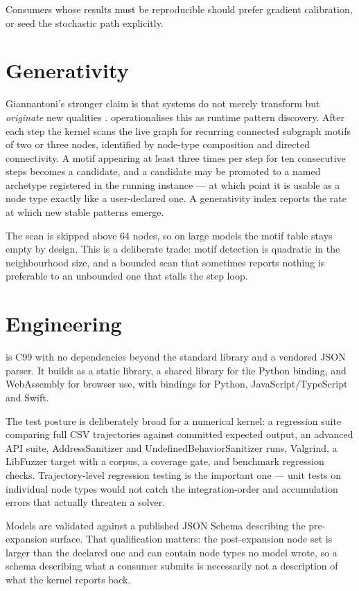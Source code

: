 \documentclass[11pt,a4paper]{article}
\begin{document}
Consumers whose results must be reproducible should prefer gradient calibration, or seed the stochastic path explicitly.

\section{Generativity}

Giannantoni's stronger claim is that systems do not merely transform but \emph{originate} new qualities \citep{giannantoni2023}. \gssk{} operationalises this as runtime pattern discovery. After each step the kernel scans the live graph for recurring connected subgraph motifs of two or three nodes, identified by node-type composition and directed connectivity. A motif appearing at least three times per step for ten consecutive steps becomes a candidate, and a candidate may be promoted to a named archetype registered in the running instance --- at which point it is usable as a node type exactly like a user-declared one. A generativity index reports the rate at which new stable patterns emerge.

The scan is skipped above 64 nodes, so on large models the motif table stays empty by design. This is a deliberate trade: motif detection is quadratic in the neighbourhood size, and a bounded scan that sometimes reports nothing is preferable to an unbounded one that stalls the step loop.

\section{Engineering}

\gssk{} is C99 with no dependencies beyond the standard library and a vendored JSON parser. It builds as a static library, a shared library for the Python binding, and WebAssembly for browser use, with bindings for Python, JavaScript/TypeScript and Swift.

The test posture is deliberately broad for a numerical kernel: a regression suite comparing full CSV trajectories against committed expected output, an advanced API suite, AddressSanitizer and UndefinedBehaviorSanitizer runs, Valgrind, a LibFuzzer target with a corpus, a coverage gate, and benchmark regression checks. Trajectory-level regression testing is the important one --- unit tests on individual node types would not catch the integration-order and accumulation errors that actually threaten a solver.

Models are validated against a published JSON Schema describing the pre-expansion surface. That qualification matters: the post-expansion node set is larger than the declared one and can contain node types no model wrote, so a schema describing what a consumer submits is necessarily not a description of what the kernel reports back.
\end{document}

